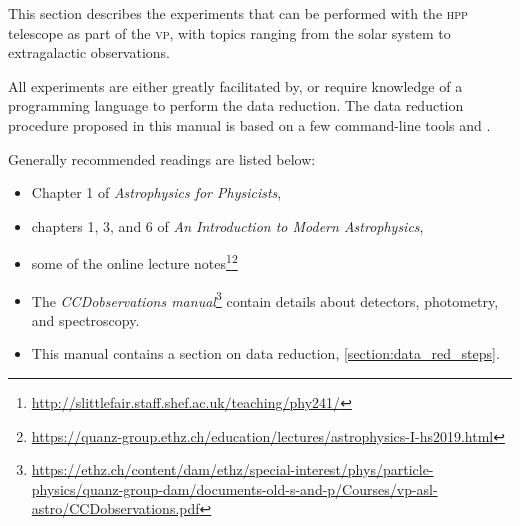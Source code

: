 \documentclass[a4paper, 11pt, fleqn]{memoir}
\begin{document}
This section describes the experiments that can be performed with the \textsc{hpp} telescope as part of the \textsc{vp}, with topics ranging from the solar system to extragalactic observations.

All experiments are either greatly facilitated by, or require knowledge of a programming language to perform the data reduction.
The data reduction procedure proposed in this manual is based on a few command-line tools and .

Generally recommended readings are listed below:
\begin{itemize}
    \item Chapter 1 of \emph{Astrophysics for Physicists}\autocite{Choudhuri}, \item chapters 1, 3, and 6 of \emph{An Introduction to Modern Astrophysics}\autocite{carroll2017introduction}, \item some of the online lecture notes\footnote{\url{http://slittlefair.staff.shef.ac.uk/teaching/phy241/}}\footnote{\url{https://quanz-group.ethz.ch/education/lectures/astrophysics-I-hs2019.html}} \item The \emph{CCDobservations manual}\footnote{\url{https://ethz.ch/content/dam/ethz/special-interest/phys/particle-physics/quanz-group-dam/documents-old-s-and-p/Courses/vp-asl-astro/CCDobservations.pdf}} contain details about detectors, photometry, and spectroscopy.
    \item
          This manual contains a section on data reduction,
          \cref{section:data_red_steps}.
\end{itemize}
\end{document}
